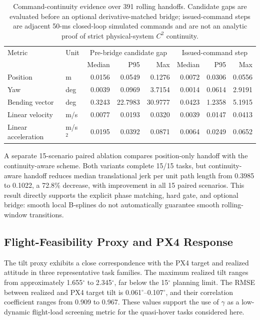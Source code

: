 \documentclass[journal,twoside]{IEEEtran}
\begin{document}
\begin{table}[t]
\centering
\caption{Command-continuity evidence over 391 rolling handoffs. Candidate gaps are evaluated before an optional derivative-matched bridge; issued-command steps are adjacent 50-ms closed-loop simulated commands and are not an analytic proof of strict physical-system $C^2$ continuity.}
\label{tab:handoff_continuity}
\setlength{\tabcolsep}{3.0pt}
\begin{tabular}{llrrr|rrr}
\toprule
Metric & Unit & \multicolumn{3}{c|}{Pre-bridge candidate gap} & \multicolumn{3}{c}{Issued-command step} \\
 & & Median & P95 & Max & Median & P95 & Max \\
\midrule
Position & m & 0.0156 & 0.0549 & 0.1276 & 0.0072 & 0.0306 & 0.0556 \\
Yaw & deg & 0.0039 & 0.0969 & 3.7154 & 0.0014 & 0.0614 & 2.9191 \\
Bending vector & deg & 0.3243 & 22.7983 & 30.9777 & 0.0423 & 1.2358 & 5.1915 \\
Linear velocity & m/s & 0.0077 & 0.0193 & 0.0320 & 0.0039 & 0.0147 & 0.0413 \\
Linear acceleration & m/s$^2$ & 0.0195 & 0.0392 & 0.0871 & 0.0064 & 0.0249 & 0.0652 \\
\bottomrule
\end{tabular}
\end{table}

A separate 15-scenario paired ablation compares position-only handoff with the continuity-aware scheme. Both variants complete 15/15 tasks, but continuity-aware handoff reduces median translational jerk per unit path length from 0.3985 to 0.1022, a 72.8\% decrease, with improvement in all 15 paired scenarios. This result directly supports the explicit phase matching, hard gate, and optional bridge: smooth local B-splines do not automatically guarantee smooth rolling-window transitions.

\subsection{Flight-Feasibility Proxy and PX4 Response}
The tilt proxy exhibits a close correspondence with the PX4 target and realized attitude in three representative task families. The maximum realized tilt ranges from approximately 1.655$^\circ$ to 2.345$^\circ$, far below the 15$^\circ$ planning limit. The RMSE between realized and PX4 target tilt is 0.061$^\circ$--0.107$^\circ$, and their correlation coefficient ranges from 0.909 to 0.967. These values support the use of $\gamma$ as a low-dynamic flight-load screening metric for the quasi-hover tasks considered here.
\end{document}
